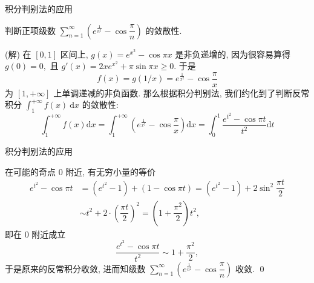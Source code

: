\begin{frame}{积分判别法的应用}

\begin{eg}
\begin{center}
判断正项级数 $\sum\limits_{n=1}^\infty \left( e^{\frac{1}{n^2}} - \cos\dfrac{\pi}{n} \right)$ 的敛散性.
\end{center}
\end{eg}

\pause
\vspace{0.6em}

\startproof[bg=yellow, fg=red](解)
在 $[0, 1]$ 区间上, $g(x) = e^{x^2} - \cos\pi x$ 是非负递增的, 因为很容易算得 $g(0) = 0,$ 且 $g'(x) = 2xe^{x^2} + \pi \sin\pi x \geqslant 0.$ 于是
\[f(x) = g(1/x) = e^{\frac{1}{x^2}} - \cos\dfrac{\pi}{x}\]
为 $[1, +\infty]$ 上单调递减的非负函数. 那么根据积分判别法, 我们约化到了判断反常积分 $\int_1^{+\infty} f(x) ~ \mathrm{d} x$ 的敛散性:
\[
\int_1^{+\infty} f(x) \mathrm{d} x = \int_1^{+\infty} \left( e^{\frac{1}{x^2}} - \cos\dfrac{\pi}{x} \right) \mathrm{d} x = \int_0^1 \dfrac{e^{t^2} - \cos\pi t}{t^2} \mathrm{d} t
\]

\end{frame}


\begin{frame}{积分判别法的应用}

在可能的奇点 $0$ 附近, 有无穷小量的等价
\begin{align*}
e^{t^2} - \cos\pi t & = (e^{t^2} - 1) + (1 - \cos\pi t) = (e^{t^2} - 1) + 2 \sin^2 \dfrac{\pi t}{2} \\
& \sim t^2 + 2 \cdot \left( \dfrac{\pi t}{2} \right)^2 = \left( 1 + \dfrac{\pi^2}{2} \right) t^2,
\end{align*}
即在 $0$ 附近成立
\[\dfrac{e^{t^2} - \cos\pi t}{t^2} \sim 1 + \dfrac{\pi^2}{2},\]
于是原来的反常积分收敛, 进而知级数 $\sum\limits_{n=1}^\infty \left( e^{\frac{1}{n^2}} - \cos\dfrac{\pi}{n} \right)$ 收敛.
\qed

\end{frame}


